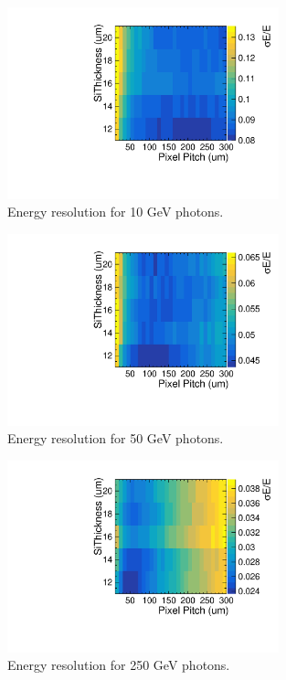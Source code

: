 \begin{figure}
  \centering
  \includegraphics[width=0.7\textwidth,keepaspectratio]{DECALStudies/fig/2DRawRes10.pdf}
  \caption{Energy resolution for 10 GeV photons.}
  \label{fig:resolution10}
\end{figure}

\begin{figure}
  \centering
  \includegraphics[width=0.7\textwidth,keepaspectratio]{DECALStudies/fig/2DRawRes50.pdf}
  \caption{Energy resolution for 50 GeV photons.}
  \label{fig:resolution50}
\end{figure}

\begin{figure}
  \centering
  \includegraphics[width=0.7\textwidth,keepaspectratio]{DECALStudies/fig/2DRawRes250.pdf}
  \caption{Energy resolution for 250 GeV photons.}
  \label{fig:resolution250}
\end{figure}

